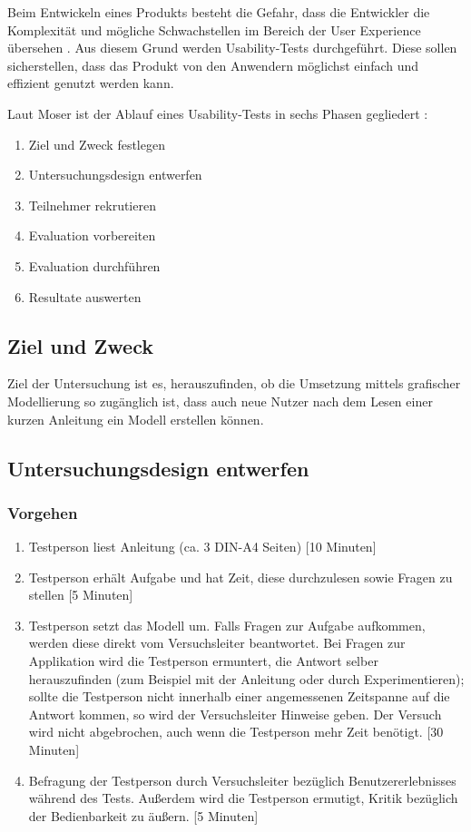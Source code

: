 Beim Entwickeln eines Produkts besteht die Gefahr, dass die Entwickler die Komplexität und mögliche Schwachstellen im Bereich der User Experience übersehen \cite{Witte2018}. Aus diesem Grund werden Usability-Tests durchgeführt. Diese sollen sicherstellen, dass das Produkt von den Anwendern möglichst einfach und effizient genutzt werden kann.

Laut Moser ist der Ablauf eines Usability-Tests in sechs Phasen gegliedert \cite{Moser2012}:
\begin{enumerate}
    \item Ziel und Zweck festlegen
    \item Untersuchungsdesign entwerfen
    \item Teilnehmer rekrutieren
    \item Evaluation vorbereiten
    \item Evaluation durchführen
    \item Resultate auswerten
\end{enumerate}

\subsection{Ziel und Zweck}
Ziel der Untersuchung ist es, herauszufinden, ob die Umsetzung mittels grafischer Modellierung so zugänglich ist, dass auch neue Nutzer nach dem Lesen einer kurzen Anleitung ein Modell erstellen können.

\subsection{Untersuchungsdesign entwerfen}

\subsubsection*{Vorgehen}
\begin{enumerate}
    \item Testperson liest Anleitung (ca. 3 DIN-A4 Seiten) [10 Minuten]
    \item Testperson erhält Aufgabe und hat Zeit, diese durchzulesen sowie Fragen zu stellen [5 Minuten]
    \item Testperson setzt das Modell um. Falls Fragen zur Aufgabe aufkommen, werden diese direkt vom Versuchsleiter beantwortet. Bei Fragen zur Applikation wird die Testperson ermuntert, die Antwort selber herauszufinden (zum Beispiel mit der Anleitung oder durch Experimentieren); sollte die Testperson nicht innerhalb einer angemessenen Zeitspanne auf die Antwort kommen, so wird der Versuchsleiter Hinweise geben. Der Versuch wird nicht abgebrochen, auch wenn die Testperson mehr Zeit benötigt. [30 Minuten]
    \item Befragung der Testperson durch Versuchsleiter bezüglich Benutzererlebnisses während des Tests. Außerdem wird die Testperson ermutigt, Kritik bezüglich der Bedienbarkeit zu äußern. [5 Minuten]
\end{enumerate}

